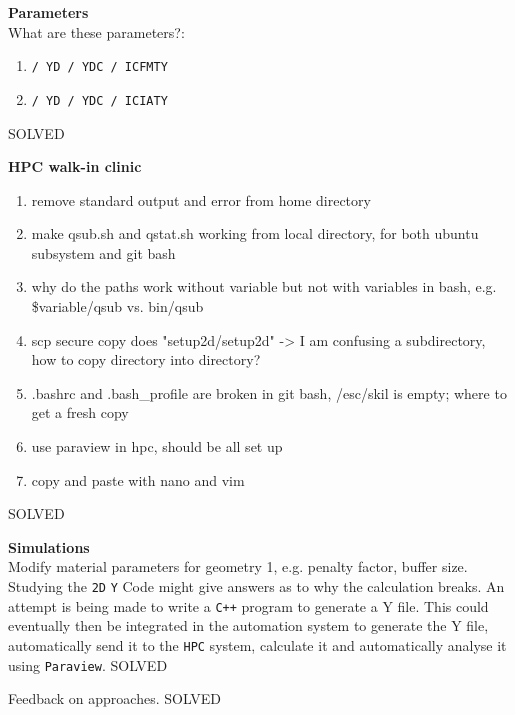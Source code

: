 {\color{blue}\textbf{}}

\bigbreak
\noindent\textbf{Parameters}\\
What are these parameters?:
\begin{enumerate}[topsep=0pt,itemsep=-1ex,partopsep=1ex,parsep=1ex,label=\Alph*)]
    \item \texttt{/ YD / YDC / ICFMTY}
    \item \texttt{/ YD / YDC / ICIATY}
\end{enumerate}

{\color{green}SOLVED}

\bigbreak
\noindent\textbf{HPC walk-in clinic \textbf{}}
        \begin{enumerate}[topsep=0pt,itemsep=-1ex,partopsep=1ex,parsep=1ex,label=\Alph*)]
            \item remove standard output and error from home directory
            \item make qsub.sh and qstat.sh working from local directory, for both ubuntu subsystem and git bash
            \item why do the paths work without variable but not with variables in bash, e.g. \$variable/qsub vs. bin/qsub
            \item scp secure copy does "setup2d/setup2d" -> I am confusing a subdirectory, how to copy directory into directory?
            \item .bashrc and .bash\_profile are broken in git bash, /esc/skil is empty;	where to get a fresh copy
            \item use paraview in hpc, should be all set up
            \item copy and paste with nano and vim
        \end{enumerate}
        
{\color{green}SOLVED}

\bigbreak
\noindent\textbf{Simulations}\\
Modify material parameters for geometry 1, e.g. penalty factor, buffer size. Studying the \texttt{2D} \texttt{Y} Code might give answers as to why the calculation breaks. An attempt is being made to write a \texttt{C++} program to generate a Y file. This could eventually then be integrated in the automation system to generate the Y file, automatically send it to the \texttt{HPC} system, calculate it and automatically analyse it using \texttt{Paraview}.
{\color{green}SOLVED}

\bigbreak
{} Feedback on approaches.
{\color{green}SOLVED}

